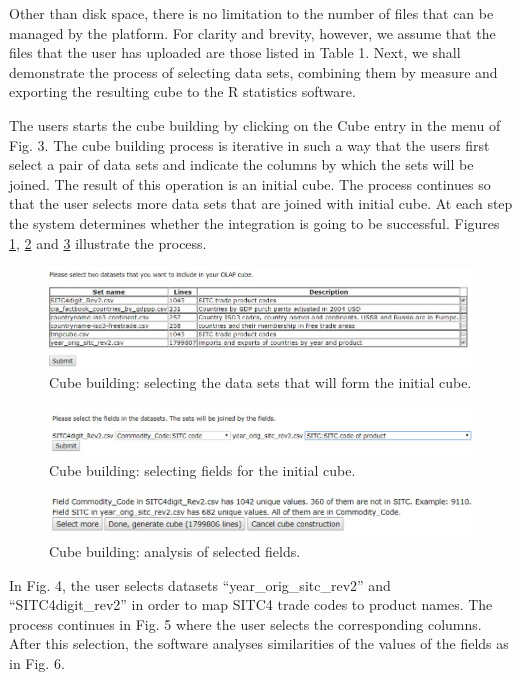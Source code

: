 \documentclass[USenglish,twocolumn]{article}
\begin{document}
Other than disk space, there is no limitation to the number of files
that can be managed by the platform. For clarity and brevity, however,
we assume that the files that the user has uploaded are those listed in
Table 1. Next, we shall demonstrate the process of selecting data sets,
combining them by measure and exporting the resulting cube to the R
statistics software.

The users starts the cube building by clicking on the Cube entry in the
menu of Fig. 3. The cube building process is iterative in such a way
that the users first select a pair of data sets and indicate the columns
by which the sets will be joined. The result of this operation is an
initial cube. The process continues so that the user selects more data
sets that are joined with initial cube. At each step the system
determines whether the integration is going to be successful. Figures
\ref{fig4}, \ref{fig5} and \ref{fig6} illustrate the process.

\begin{figure}
\includegraphics[scale=0.3]{fig4.JPG}
\caption{Cube building: selecting the data sets that will form the initial cube.\label{fig4}}
\end{figure}

\begin{figure}
\includegraphics[scale=0.3]{fig5.JPG}
\caption{Cube building: selecting fields for the initial cube.\label{fig5}}
\end{figure}

\begin{figure}
\includegraphics[scale=0.3]{fig6.JPG}
\caption{Cube building: analysis of selected fields.\label{fig6}}
\end{figure}

In Fig. 4, the user selects datasets ``year\_orig\_sitc\_rev2'' and
``SITC4digit\_rev2'' in order to map SITC4 trade codes to product names.
The process continues in Fig. 5 where the user selects the corresponding
columns. After this selection, the software analyses similarities of the
values of the fields as in Fig. 6.
\end{document}
